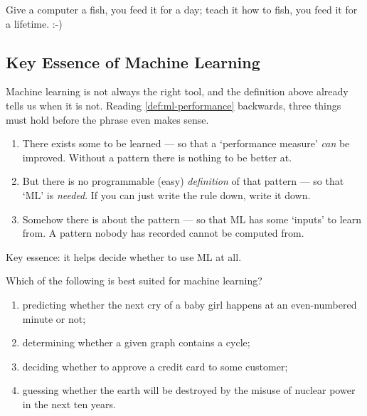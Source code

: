 \begin{remark}
    Give a computer a fish, you feed it for a day; teach it how to fish, you
    feed it for a lifetime. :-)
\end{remark}

\subsection{Key Essence of Machine Learning}

Machine learning is not always the right tool, and the definition above already
tells us when it is not. Reading \autoref{def:ml-performance} backwards, three
things must hold before the phrase even makes sense.

\begin{enumerate}
    \item There exists some  to be learned --- so that
        a `performance measure' \emph{can} be improved. Without a pattern there
        is nothing to be better at.
    \item But there is no programmable (easy) \emph{definition} of that pattern
        --- so that `ML' is \emph{needed}. If you can just write the rule down,
        write it down.
    \item Somehow there is  about the pattern --- so that ML has some
        `inputs' to learn from. A pattern nobody has recorded cannot be computed
        from.
\end{enumerate}

\begin{moral}
    Key essence: it helps decide whether to use ML at all.
\end{moral}

\begin{exercise}
    Which of the following is best suited for machine learning?
    \begin{enumerate}[(1)]
        \item predicting whether the next cry of a baby girl happens at an
            even-numbered minute or not;
        \item determining whether a given graph contains a cycle;
        \item deciding whether to approve a credit card to some customer;
        \item guessing whether the earth will be destroyed by the misuse of
            nuclear power in the next ten years.
    \end{enumerate}
\end{exercise}

